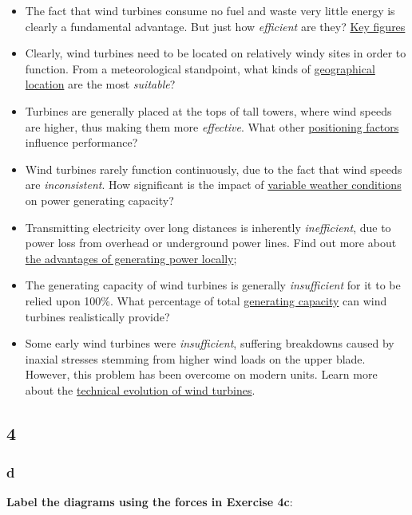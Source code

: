 \begin{itemize}

\item The fact that wind turbines consume no fuel and waste very little energy is clearly a fundamental advantage. But just how \textit{efficient} are they? \underline{Key figures}
\item Clearly, wind turbines need to be located on relatively windy sites in order to function. From a meteorological standpoint, what kinds of \underline{geographical location} are the most \textit{suitable}?
\item Turbines are generally placed at the tops of tall towers, where wind speeds are higher, thus making them more \textit{effective}. What other \underline{positioning factors} influence performance?
\item Wind turbines rarely function continuously, due to the fact that wind speeds are \textit{inconsistent}. How significant is the impact of \underline{variable weather conditions} on power generating capacity?
\item Transmitting electricity over long distances is inherently \textit{inefficient}, due to power loss from overhead or underground power lines. \newline Find out more about \underline{the advantages of generating power locally};
\item The generating capacity of wind turbines is generally \textit{insufficient} for it to be relied upon 100\%. What percentage of total \underline{generating capacity} can wind turbines realistically provide?
\item Some early wind turbines were \textit{insufficient}, suffering breakdowns caused by inaxial stresses stemming from higher wind loads on the upper blade. However, this problem has been overcome on modern units. Learn more about the \underline{technical evolution of wind turbines}.

\end{itemize}

\subsection{4}

\subsubsection{d}

\textbf{Label the diagrams using the forces in Exercise 4c}:

